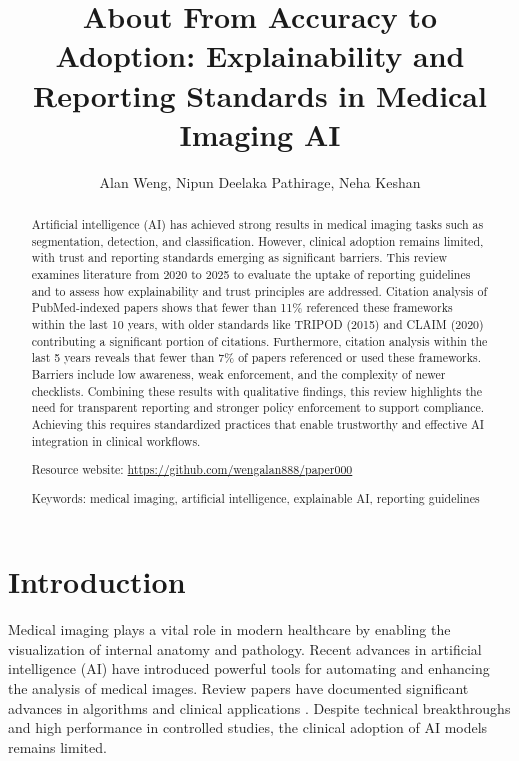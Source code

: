 \documentclass{article}
\title{About
From Accuracy to Adoption: Explainability and Reporting Standards in Medical Imaging AI}
\author{Alan Weng, Nipun Deelaka Pathirage, Neha Keshan}
\begin{document}
\maketitle

\begin{abstract}
Artificial intelligence (AI) has achieved strong results in medical imaging tasks such as segmentation, detection, and classification. However, clinical adoption remains limited, with trust and reporting standards emerging as significant barriers. This review examines literature from 2020 to 2025 to evaluate the uptake of reporting guidelines and to assess how explainability and trust principles are addressed. Citation analysis of PubMed-indexed papers shows that fewer than 11\% referenced these frameworks within the last 10 years, with older standards like TRIPOD (2015) and CLAIM (2020) contributing a significant portion of citations. Furthermore, citation analysis within the last 5 years reveals that fewer than 7\% of papers referenced or used these frameworks. Barriers include low awareness, weak enforcement, and the complexity of newer checklists. Combining these results with qualitative findings, this review highlights the need for transparent reporting and stronger policy enforcement to support compliance. Achieving this requires standardized practices that enable trustworthy and effective AI integration in clinical workflows.


Resource website: \hyperlink{https://github.com/wengalan888/paper000}{https://github.com/wengalan888/paper000}


Keywords: medical imaging, artificial intelligence, explainable AI, reporting guidelines

\end{abstract}

\section{Introduction}
Medical imaging plays a vital role in modern healthcare by enabling the visualization of internal anatomy and pathology. Recent advances in artificial intelligence (AI) have introduced powerful tools for automating and enhancing the analysis of medical images. Review papers have documented significant advances in algorithms and clinical applications \cite{panayides_2020_ai,tang_2019_the,zakaria_2024_advancements}. Despite technical breakthroughs and high performance in controlled studies, the clinical adoption of AI models remains limited. 
\end{document}
